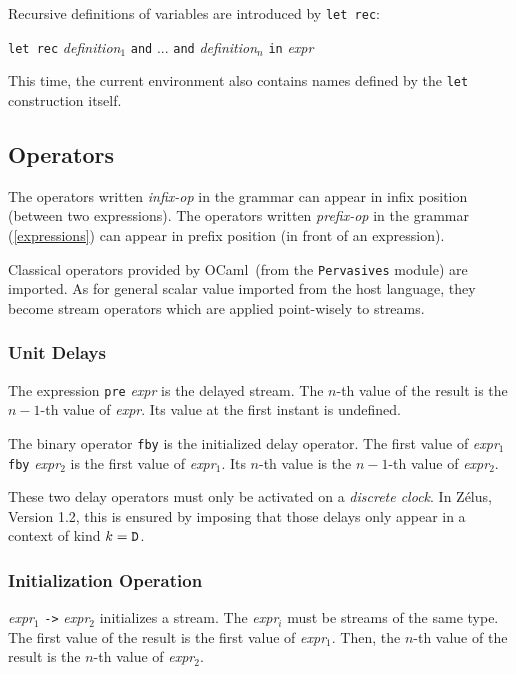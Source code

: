 \documentclass[11pt,titlepage,twoside]{report}
\newcommand{\zelus}{{\sf Z\'elus}}
\newcommand{\ocaml}{{\sf OCaml}}
\newcommand{\Let}{\mbox{{\tt let}}}
\newcommand{\Rec}{\mbox{{\tt rec}}}
\newcommand{\In}{\mbox{{\tt in}}}
\newcommand{\And}{\mbox{{\tt and}}}
\newcommand{\Pre}{\mbox{{\tt pre}}}
\newcommand{\Fby}{\mbox{{\tt fby}}}
\newcommand{\Minusgreater}{\mbox{{\tt ->}}}
\newcommand{\term}[1]{{\tt #1}}
\newcommand{\nterm}[1]{{\em #1}}
\begin{document}
Recursive definitions of variables are introduced by \term{\Let\ \Rec}:
\begin{center}
  \term{\Let\ \Rec} \nterm{definition}$_1$ \term{\And} ... 
  \term{\And} \nterm{definition}$_n$ \term{\In} \nterm{expr}
\end{center}

This time, the current environment also contains names defined by the \term{\Let}
construction itself.

\subsection{Operators\label{operators}} %

The operators written \nterm{infix-op} in the grammar can appear in
infix position (between two expressions). The operators written
\nterm{prefix-op} in the grammar (\cref{expressions}) can appear
in prefix position (in front of an expression).

Classical operators provided by \ocaml\ (from the {\tt Pervasives}
module) are imported. As for general scalar value imported from the
host language, they become stream operators which are applied
point-wisely to streams.

\subsubsection{Unit Delays} %

The expression \term{\Pre} \nterm{expr} is the delayed
stream. The $n$-th value of the result is the $n-1$-th
value of \nterm{expr}. Its value at the first instant is undefined.

The binary operator \term{\Fby} is the initialized delay operator. The
first value of \nterm{expr}$_1$ \term{\Fby} \nterm{expr}$_2$ is the
first value of \nterm{expr}$_1$. Its $n$-th value is the $n-1$-th
value of \nterm{expr}$_2$.

These two delay operators must only be activated on a \emph{discrete clock}. In
\zelus, Version 1.2, this is ensured by imposing that those delays only
appear in a context of kind $k = \mathtt{D}$.

\subsubsection{Initialization Operation} %

\nterm{expr}$_1$ \term{\Minusgreater} \nterm{expr}$_2$ initializes a
stream. The \nterm{expr}$_i$ must be streams of the same type. The
first value of the result is the first value of
\nterm{expr}$_1$. Then, the $n$-th value of the result is the $n$-th
value of \nterm{expr}$_2$.
\end{document}
